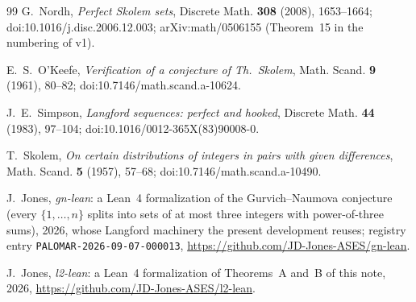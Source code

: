 \documentclass[11pt]{amsart}
\theoremstyle{plain}
\theoremstyle{definition}
\theoremstyle{remark}
\begin{document}
\begin{thebibliography}{99}
G.~Nordh,
\emph{Perfect Skolem sets},
Discrete Math. \textbf{308} (2008), 1653--1664; doi:10.1016/j.disc.2006.12.003;
arXiv:math/0506155 (Theorem~15 in the numbering of v1).

E.~S.~O'Keefe,
\emph{Verification of a conjecture of Th.~Skolem},
Math. Scand. \textbf{9} (1961), 80--82; doi:10.7146/math.scand.a-10624.

J.~E.~Simpson,
\emph{Langford sequences: perfect and hooked},
Discrete Math. \textbf{44} (1983), 97--104; doi:10.1016/0012-365X(83)90008-0.

T.~Skolem,
\emph{On certain distributions of integers in pairs with given differences},
Math. Scand. \textbf{5} (1957), 57--68; doi:10.7146/math.scand.a-10490.

J.~Jones, \emph{gn-lean}: a Lean~4 formalization of the Gurvich--Naumova conjecture (every
$\{1,\dots,n\}$ splits into sets of at most three integers with power-of-three sums), 2026,
whose Langford machinery the present development reuses; registry entry
\texttt{PALOMAR-2026-09-07-000013}, \url{https://github.com/JD-Jones-ASES/gn-lean}.

J.~Jones, \emph{l2-lean}: a Lean~4 formalization of Theorems~A and~B of this note, 2026,
\url{https://github.com/JD-Jones-ASES/l2-lean}.

\end{thebibliography}
\end{document}
